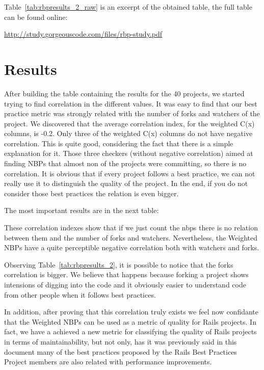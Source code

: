 
Table~\ref{tab:rbpresults_2_raw} is an excerpt of the obtained table, the full table can be found online: 

\url{http://study.gorgeouscode.com/files/rbp-study.pdf}




\section{Results}\label{subsec:results}
After building the table containing the results for the 40 projects, 
we started trying to find correlation in the different values. 
It was easy to find that our best practice metric was strongly related with the number of forks and watchers of the project.
We discovered that the average correlation index, for the weighted C(x) columns, is -0.2. 
Only three of the weighted C(x) columns do not have negative correlation. 
This is quite good, considering the fact that there is a simple explanation for it. 
Those three checkers (without negative correlation) aimed at finding NBPs that almost non of the projects were committing, 
so there is no correlation. 
It is obvious that if every project follows a best practice, we can not really use it to distinguish the quality of the project.
In the end, if you do not consider those best practices the relation is even bigger.


The most important results are in the next table:


These correlation indexes show that if we just count the nbps there is no relation between them and the number of forks and watchers. Nevertheless, the Weighted NBPs have a quite perceptible negative correlation both with watchers and forks. 

Observing Table~\ref{tab:rbpresults_2}, it is possible to notice that the forks correlation is bigger. 
We believe that happens because forking a project shows intensions of digging into the code and 
it obviously easier to understand code from other people when it follows best practices.

In addition, after proving that this correlation truly exists we feel now confidante that 
the Weighted NBPs can be used as a metric of quality for Rails projects.
In fact, we have a achieved a new metric for classifying the quality of Rails projects in terms of maintainability,
but not only, has it was previously said in this document many of the best practices
proposed by the Rails Best Practices Project members are also related with performance improvements.


